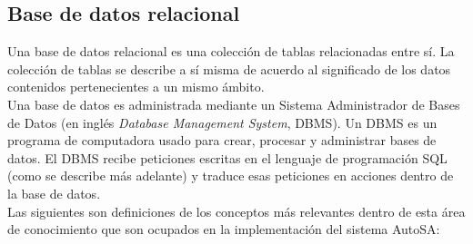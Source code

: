 \subsection{Base de datos relacional}\label{sec:bd-r}
Una base de datos relacional es una colección de tablas relacionadas entre sí. La colección de tablas se describe a sí misma de acuerdo al significado de los datos contenidos pertenecientes a un mismo ámbito\cite{DataBaseConcepts}.\\
Una base de datos es administrada mediante un Sistema Administrador de Bases de Datos (en inglés \textit{Database Management System}, DBMS). Un DBMS es un programa de computadora usado para crear, procesar y administrar bases de datos. El DBMS recibe peticiones escritas en el lenguaje de programación SQL (como se describe más adelante) y traduce esas peticiones en acciones dentro de la base de datos\cite{DataBaseConcepts}.\\
Las siguientes son definiciones de los conceptos más relevantes dentro de esta área de conocimiento que son ocupados en la implementación del sistema AutoSA:
